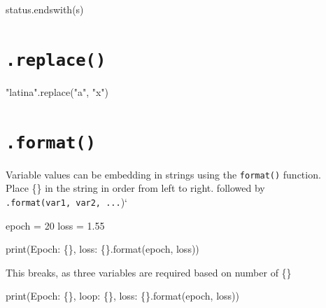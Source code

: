 \documentclass[
  letterpaper,
  DIV=11,
  numbers=noendperiod]{scrreprt}
\newenvironment{Shaded}{\begin{snugshade}}{\end{snugshade}}
\newcommand{\BuiltInTok}[1]{\textcolor[rgb]{0.00,0.23,0.31}{#1}}
\newcommand{\CommentTok}[1]{\textcolor[rgb]{0.37,0.37,0.37}{#1}}
\newcommand{\DecValTok}[1]{\textcolor[rgb]{0.68,0.00,0.00}{#1}}
\newcommand{\FloatTok}[1]{\textcolor[rgb]{0.68,0.00,0.00}{#1}}
\newcommand{\NormalTok}[1]{\textcolor[rgb]{0.00,0.23,0.31}{#1}}
\newcommand{\OperatorTok}[1]{\textcolor[rgb]{0.37,0.37,0.37}{#1}}
\newcommand{\SpecialCharTok}[1]{\textcolor[rgb]{0.37,0.37,0.37}{#1}}
\newcommand{\StringTok}[1]{\textcolor[rgb]{0.13,0.47,0.30}{#1}}
\begin{document}
\begin{Shaded}
\begin{Highlighting}[]
\NormalTok{status.endswith(}\StringTok{\textquotesingle{}s\textquotesingle{}}\NormalTok{)}
\end{Highlighting}
\end{Shaded}

\hypertarget{replace}{%
\section{\texorpdfstring{\texttt{.replace()}}{.replace()}}\label{replace}}

\begin{Shaded}
\begin{Highlighting}[]
\CommentTok{"latina"}\NormalTok{.replace(}\StringTok{"a"}\NormalTok{, }\StringTok{"x"}\NormalTok{)}
\end{Highlighting}
\end{Shaded}

\hypertarget{format}{%
\section{\texorpdfstring{\texttt{.format()}}{.format()}}\label{format}}

Variable values can be embedding in strings using the \texttt{format()}
function.\\
Place \{\} in the string in order from left to right. followed by
\texttt{.format(var1,\ var2,\ ...})`

\begin{Shaded}
\begin{Highlighting}[]
\NormalTok{epoch }\OperatorTok{=} \DecValTok{20}
\NormalTok{loss }\OperatorTok{=} \FloatTok{1.55}

\BuiltInTok{print}\NormalTok{(}\StringTok{\textquotesingle{}Epoch: }\SpecialCharTok{\{\}}\StringTok{, loss: }\SpecialCharTok{\{\}}\StringTok{\textquotesingle{}}\NormalTok{.}\BuiltInTok{format}\NormalTok{(epoch, loss))}
\end{Highlighting}
\end{Shaded}

This breaks, as three variables are required based on number of \{\}

\begin{Shaded}
\begin{Highlighting}[]
\BuiltInTok{print}\NormalTok{(}\StringTok{\textquotesingle{}Epoch: }\SpecialCharTok{\{\}}\StringTok{, loop: }\SpecialCharTok{\{\}}\StringTok{, loss: }\SpecialCharTok{\{\}}\StringTok{\textquotesingle{}}\NormalTok{.}\BuiltInTok{format}\NormalTok{(epoch, loss))}
\end{Highlighting}
\end{Shaded}
\end{document}

